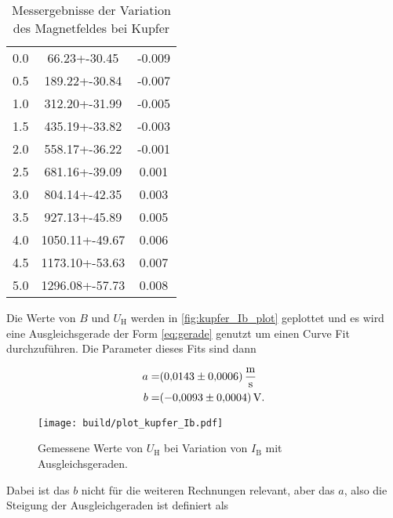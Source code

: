 \begin{table}
    \centering
    \caption{Messergebnisse der Variation des Magnetfeldes bei Kupfer}
    \label{tab:werte_kupfer_B}
    \begin{tabular}{S[table-format=1.1] S[table-format=4.2+-2.2] S[table-format=-1.3]}
        \toprule
         &  &  \\
         & 66.23+-30.45 & -0.009\\
        0.5 & 189.22+-30.84 & -0.007\\
        1.0 & 312.20+-31.99 & -0.005\\
        1.5 & 435.19+-33.82 & -0.003\\
        2.0 & 558.17+-36.22 & -0.001\\
        2.5 & 681.16+-39.09 & 0.001\\
        3.0 & 804.14+-42.35 & 0.003\\
        3.5 & 927.13+-45.89 & 0.005\\
        4.0 & 1050.11+-49.67 & 0.006\\
        4.5 & 1173.10+-53.63 & 0.007\\
        5.0 & 1296.08+-57.73 & 0.008\\
        \bottomrule
    \end{tabular}
\end{table}

Die Werte von $B$ und $U_\text{H}$ werden in \autoref{fig:kupfer_Ib_plot} geplottet und es wird eine Ausgleichsgerade der Form \autoref{eq:gerade} genutzt um einen Curve Fit durchzuführen.
Die Parameter dieses Fits sind dann

\begin{align*}
    a =& \SI{0.0143+-0.0006}{\per\second\meter} \\
    b =& \SI{-0.0093+-0.0004}{\volt}.
    \label{eq:params_Ib}
\end{align*}

\begin{figure}
    \centering
    \texttt{[image: build/plot\_kupfer\_Ib.pdf]}
    \caption{Gemessene Werte von $U_\text{H}$ bei Variation von $I_\text{B}$ mit Ausgleichsgeraden.\cite{numpy}}
    \label{fig:kupfer_Ib_plot}
\end{figure}

Dabei ist das $b$ nicht für die weiteren Rechnungen relevant, aber das $a$, also die Steigung der Ausgleichgeraden ist definiert als

